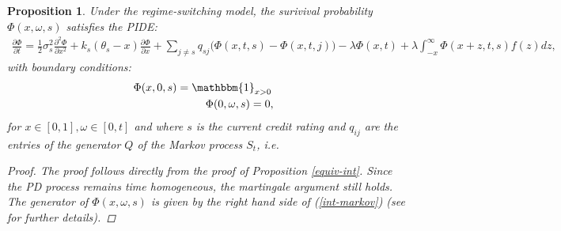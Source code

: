 \documentclass[11pt,reqno]{article}
\newtheorem{proposition}[theorem]{Proposition}
\theoremstyle{definition}
\begin{document}
\begin{proposition} \label{pide-rs}
	Under the regime-switching model, the surivival probability $\Phi(x,\omega,s)$ satisfies the PIDE:
	\begin{eqnarray} \label{int-markov}
	\frac{\partial \Phi}{\partial t}=\frac{1}{2} \sigma_s^{2} \frac{\partial^{2} \Phi}{\partial x^{2}}+k_s(\theta_s-x) \frac{\partial \Phi}{\partial x} + \sum_{j \neq s} q_{sj} \Big(\Phi(x,t,s) - \Phi(x,t,j)\Big)  - \lambda \Phi(x,t)+\lambda \int_{-x}^{\infty}\Phi(x+z,t,s)f(z)dz,
	\end{eqnarray}
	with boundary conditions: 
	\begin{align}
	\Phi(x,0,s)= \mathbbm{1}_{x > 0}\,\,\ \\
	\Phi(0,\omega,s) = 0, \,\,\,
	\end{align} 
	for $x \in [0,1], \omega \in [0,t]$ and where $s$ is the current credit rating and $q_{ij}$ are the entries of the generator $Q$ of the Markov process $S_t$, i.e. 
	

	
	\begin{proof}
		The proof follows directly from the proof of Proposition \ref{equiv-int}. Since the PD process remains time homogeneous, the martingale argument still holds. The generator of $\Phi(x,\omega,s)$ is given by the right hand side of (\ref{int-markov}) (see \cite{hainaut2014intensity} for further details).
	\end{proof}
\end{proposition}
\end{document}
